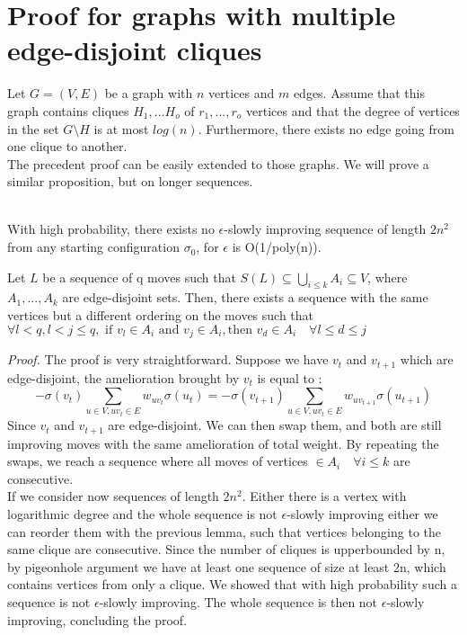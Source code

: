 \section{Proof for graphs with multiple edge-disjoint cliques}
Let $G = (V,E)$ be a graph with $n$ vertices and $m$ edges. Assume that this graph contains cliques $H_1, ... H_o$ of $r_1, ... , r_o$ vertices and that the degree of vertices in the set $G \setminus H$ is at most $log(n)$. Furthermore, there exists no edge going from one clique to another.\\

The precedent proof can be easily extended to those graphs. We will prove a similar proposition, but on longer sequences.

\begin{proposition}
\leavevmode \\
With high probability, there exists no $\epsilon$-slowly improving sequence of length $2n^2$ from any starting configuration $\sigma_0$, for $\epsilon$ is O(1/poly(n)).
\end{proposition}

\begin{lemma}
\label{edgeDisjoint}
Let $L$ be a sequence of q moves such that $S(L) \subseteq \bigcup_{i \leq k}A_i  \subseteq V$, where $A_1, ... , A_k$ are edge-disjoint sets. Then, there exists a sequence with the same vertices but a different ordering on the moves such that $\forall l < q, l < j \leq q, \text{ if } v_l \in A_i \text{ and } v_j \in A_i, \text{then } v_d \in A_i \quad\forall l \leq d  \leq j$   
\end{lemma}
\textit{Proof.} The proof is very straightforward. Suppose we have $v_t$ and $v_{t+1}$ which are edge-disjoint, the amelioration brought by $v_t$ is equal to :
\begin{equation*}
-\sigma(v_t) \sum_{u \in V, uv_t \in E}w_{uv_t}\sigma(u_t) = -\sigma(v_{t+1}) \sum_{u \in V, uv_t \in E}w_{uv_{t+1}}\sigma(u_{t + 1}) 
\end{equation*}
Since $v_t$ and $v_{t+1}$ are edge-disjoint. We can then swap them, and both are still improving moves with the same amelioration of total weight. By repeating the swaps, we reach a sequence where all moves of vertices $\in A_i \quad \forall i \leq k$ are consecutive.\\

If we consider now sequences of length $2n^2$. Either there is a vertex with logarithmic degree and the whole sequence is not $\epsilon$-slowly improving either we can reorder them with the previous lemma, such that vertices belonging to the same clique are consecutive. Since the number of cliques is upperbounded by n, by pigeonhole argument we have at least one sequence of size at least 2n, which contains vertices from only a clique. We showed that with high probability such a sequence is not $\epsilon$-slowly improving. The whole sequence is then not $\epsilon$-slowly improving, concluding the proof.